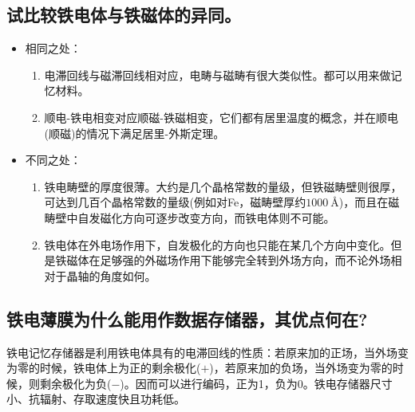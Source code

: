 \documentclass[a4paper]{article}
\begin{document}
\subsection{试比较铁电体与铁磁体的异同。}
\begin{itemize}
\item 相同之处：
\begin{enumerate}
    \item 电滞回线与磁滞回线相对应，电畴与磁畴有很大类似性。都可以用来做记忆材料。
    \item 顺电-铁电相变对应顺磁-铁磁相变，它们都有居里温度的概念，并在顺电(顺磁)的情况下满足居里-外斯定理。
\end{enumerate}
\item 不同之处：
\begin{enumerate}
    \item 铁电畴壁的厚度很薄。大约是几个晶格常数的量级，但铁磁畴壁则很厚，可达到几百个晶格常数的量级(例如对Fe，磁畴壁厚约$\SI{1000}{\angstrom}$)，而且在磁畴壁中自发磁化方向可逐步改变方向，而铁电体则不可能。
    \item 铁电体在外电场作用下，自发极化的方向也只能在某几个方向中变化。但是铁磁体在足够强的外磁场作用下能够完全转到外场方向，而不论外场相对于晶轴的角度如何。
\end{enumerate}
\end{itemize}

\subsection{铁电薄膜为什么能用作数据存储器，其优点何在?}
铁电记忆存储器是利用铁电体具有的电滞回线的性质：若原来加的正场，当外场变为零的时候，铁电体上为正的剩余极化($+$)，若原来加的负场，当外场变为零的时候，则剩余极化为负($-$)。因而可以进行编码，正为1，负为0。铁电存储器尺寸小、抗辐射、存取速度快且功耗低。

\nocite{jiaocai}

\end{document}
